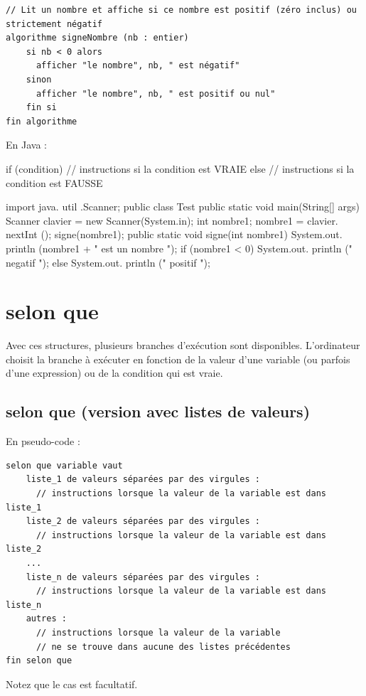 \documentclass[11pt,a4paper]{article}
\begin{document}
            \par
        \begin{verbatim}
// Lit un nombre et affiche si ce nombre est positif (zéro inclus) ou strictement négatif
algorithme signeNombre (nb : entier)
    si nb < 0 alors
      afficher "le nombre", nb, " est négatif"
    sinon
      afficher "le nombre", nb, " est positif ou nul"
    fin si
fin algorithme
    \end{verbatim}En Java :
            \par
        \begin{Java}
if (condition) { 
      // instructions si la condition est VRAIE
} else { 
      // instructions si la condition est FAUSSE
} 
      \end{Java}\begin{Java}
import java. util .Scanner;
public class Test {
    public static void main(String[] args){
      Scanner clavier = new Scanner(System.in);
      int nombre1;
      nombre1 = clavier. nextInt ();
      signe(nombre1);
    }
    public static void signe(int nombre1) {
      System.out. println (nombre1 + " est un nombre ");
      if (nombre1 < 0) {
        System.out. println (" negatif ");
      } else {
        System.out. println (" positif ");
      }
    }
}
    \end{Java}\section{selon que}Avec ces structures, plusieurs branches d'ex\'ecution sont disponibles. L'ordinateur choisit la
    branche \`a ex\'ecuter en fonction de la valeur d'une variable (ou parfois d'une expression) ou
    de la condition qui est vraie.\subsection{selon que (version avec listes de valeurs)}En pseudo-code :
            \par
        \begin{verbatim}
selon que variable vaut
    liste_1 de valeurs séparées par des virgules :
      // instructions lorsque la valeur de la variable est dans liste_1
    liste_2 de valeurs séparées par des virgules :
      // instructions lorsque la valeur de la variable est dans liste_2
    ...
    liste_n de valeurs séparées par des virgules :
      // instructions lorsque la valeur de la variable est dans liste_n
    autres :
      // instructions lorsque la valeur de la variable
      // ne se trouve dans aucune des listes précédentes
fin selon que
      \end{verbatim}Notez que le cas \verb@autres@ est facultatif.
            \par
        
\end{document}
